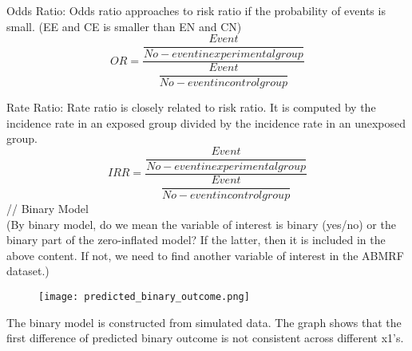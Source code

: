 \documentclass[jou, apacite]{apa6}
\begin{document}
Odds Ratio: Odds ratio approaches to risk ratio if the probability of events is small. (EE and CE is smaller than EN and CN)\\
\begin{equation}
OR = \dfrac{\dfrac{Event}{No-event in experimental group}}{\dfrac{Event}{No-event in control group}}
\end{equation}

Rate Ratio: Rate ratio is closely related to risk ratio. It is computed by the incidence rate in an exposed group divided by the incidence rate in an unexposed group. \\
\begin{equation}
IRR = \dfrac{\dfrac{Event}{No-eventin  experimental group}}{\dfrac{Event}{No-event in control group}}
\end{equation}
// Binary Model \\
(By binary model, do we mean the variable of interest is binary (yes/no) or the binary part of the zero-inflated model? If the latter, then it is included in the above content. If not, we need to find another variable of interest in the ABMRF dataset.)

\begin{figure}[h]
\texttt{[image: predicted\_binary\_outcome.png]}
\end{figure}

The binary model is constructed from simulated data. The graph shows that the first difference of predicted binary outcome is not consistent across different x1's. 
\end{document}
